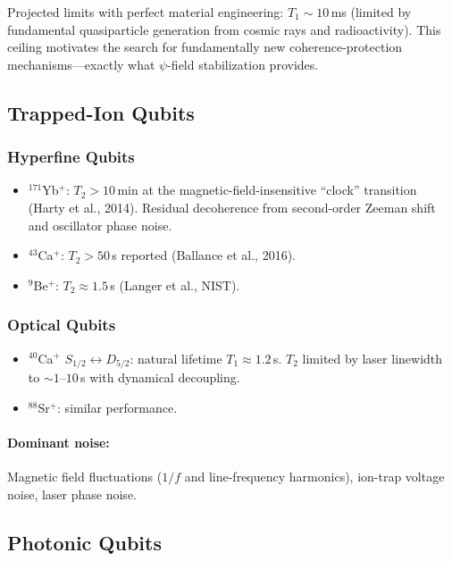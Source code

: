 \documentclass[11pt,letterpaper]{article}
\begin{document}
Projected limits with perfect material engineering: $T_1 \sim 10$\,ms
(limited by fundamental quasiparticle generation from cosmic rays and
radioactivity). This ceiling motivates the search for fundamentally new
coherence-protection mechanisms---exactly what $\psi$-field stabilization
provides.

\subsection{Trapped-Ion Qubits}

\subsubsection{Hyperfine Qubits}

\begin{itemize}
\item $^{171}$Yb$^+$: $T_2 > 10$\,min at the magnetic-field-insensitive
``clock'' transition (Harty et al., 2014). Residual decoherence from
second-order Zeeman shift and oscillator phase noise.
\item $^{43}$Ca$^+$: $T_2 > 50$\,s reported (Ballance et al., 2016).
\item $^9$Be$^+$: $T_2 \approx 1.5$\,s (Langer et al., NIST).
\end{itemize}

\subsubsection{Optical Qubits}

\begin{itemize}
\item $^{40}$Ca$^+$ $S_{1/2} \leftrightarrow D_{5/2}$: natural lifetime
$T_1 \approx 1.2$\,s. $T_2$ limited by laser linewidth to
$\sim 1$--$10$\,s with dynamical decoupling.
\item $^{88}$Sr$^+$: similar performance.
\end{itemize}

\paragraph{Dominant noise:} Magnetic field fluctuations ($1/f$ and
line-frequency harmonics), ion-trap voltage noise, laser phase noise.

\subsection{Photonic Qubits}
\end{document}

